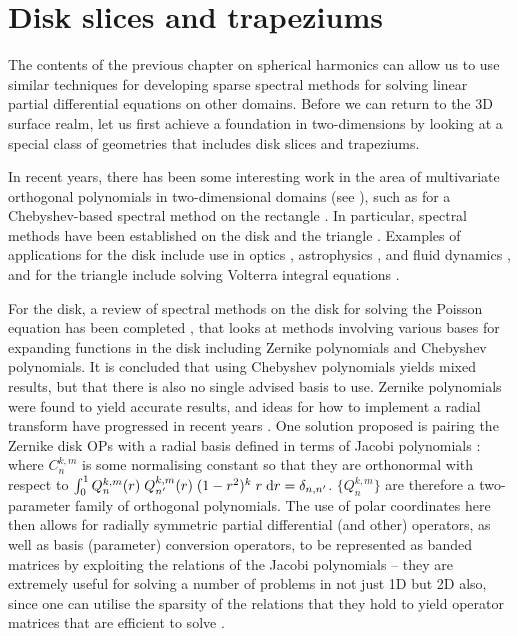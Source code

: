 

\chapter{Disk slices and trapeziums}\label{CHAPTER:diskslice}

The contents of the previous chapter on spherical harmonics can allow us to use similar techniques for developing sparse spectral methods for solving linear partial differential equations on other domains. Before we can return to the 3D surface realm, let us first achieve a foundation in two-dimensions by looking at a special class of geometries that includes disk slices and trapeziums.

In recent years, there has been some interesting work in the area of multivariate orthogonal polynomials in two-dimensional domains (see \cite{dunkl2014orthogonal}), such as for a Chebyshev-based spectral method on the rectangle \cite{julien2009efficient}. In particular, spectral methods have been established on the disk \cite{boyd2011comparing, vasil2016tensor} and the triangle \cite{olver2019triangle}. Examples of applications for the disk include use in optics \cite{mahajan2007orthonormal}, astrophysics \cite{pringle1981accretion}, and fluid dynamics \cite{eggels1994fully, noll1976zernike, kerswell2005recent}, and for the triangle include solving Volterra integral equations \cite{gutleb2020sparse}. 

For the disk, a review of spectral methods on the disk for solving the Poisson equation has been completed \cite{boyd2011comparing}, that looks at methods involving various bases for expanding functions in the disk including Zernike polynomials and Chebyshev polynomials. It is concluded that using Chebyshev polynomials yields mixed results, but that there is also no single advised basis to use. Zernike polynomials were found to yield accurate results, and ideas for how to implement a radial transform have progressed in recent years \cite{slevinsky2018use, sakai2009application, wilber2017computing} . One solution proposed is pairing the Zernike disk OPs with a radial basis defined in terms of Jacobi polynomials \cite{vasil2016tensor}:
where $C_n^{k,m}$ is some normalising constant so that they are orthonormal with respect to $\int_0^1 Q_n^{k,m}(r) \; Q_{n'}^{k,m}(r) \; (1-r^2)^k \; r \; {\rm d} r = \delta_{n,n'}$. $\{Q_n^{k,m}\}$ are therefore a two-parameter family of orthogonal polynomials. The use of polar coordinates here then allows for radially symmetric partial differential (and other) operators, as well as basis (parameter) conversion operators, to be represented as banded matrices by exploiting the relations of the Jacobi polynomials -- they are extremely useful for solving a number of problems in not just 1D but 2D also, since one can utilise the sparsity of the relations that they hold to yield operator matrices that are efficient to solve \cite{doha2006efficient}.

